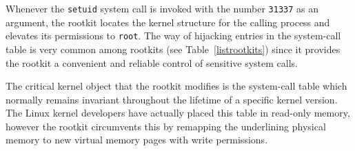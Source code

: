 \setlength{\textfloatsep}{0.5mm}
\begin{table}%
\begin{center}

\end{center}
\caption{Testing machine specification}
\label{machinespecs}
\end{table}



Whenever the \texttt{setuid} system call is invoked with the number \texttt{31337} as an argument, the rootkit locates the kernel structure for the calling process and elevates its permissions to \texttt{root}. The way of hijacking entries in the system-call table is very common among rootkits (see Table~\ref{listrootkits}) since it provides the rootkit a convenient and reliable control of sensitive system calls.

The critical kernel object that the rootkit modifies is the system-call table which normally remains invariant throughout the lifetime of a specific kernel version. The Linux kernel developers have actually placed this table in read-only memory, however the rootkit circumvents this by remapping the underlining physical memory to new virtual memory pages with write permissions.

